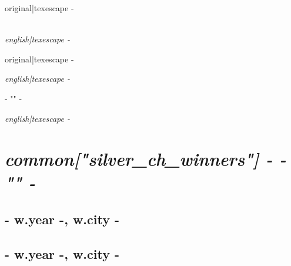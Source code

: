 {%

{%
{%
{\large {{ original|texescape -}} } 
{%
{%
{\normalsize{}}
\nopagebreak[3]\\{\itshape {{ english|texescape -}} }
{%
\begin{addmargin}[-0.05em]{0em}{\normalsize {{ original|texescape -}} }\end{addmargin}{\itshape {{ english|texescape -}} }
{%
\begin{addmargin}[-0.05em]{0em}{\normalsize{ {{- "}}" -}}\end{addmargin}{\itshape {{ english|texescape -}} }
{%
{\large{}}
{%
{%
{%

{%
{%
{%
{%
{%
{%
{%
{%
{%
{%

{%
\chapter*{\hfill{\slshape {{ common["silver_ch_winners"] -}} {{- "}}" -}}
\thispagestyle{empty}
\vspace{70pt}
{%
{%
    \section*{ {{- w.year -}}, {{ w.city -}} }
{%
    \section*{ {{- w.year -}}, {{ w.city -}} }
{%
{%
    {%
}}}}}}}}}}}}}}}}}}}}}}}}}}}}
